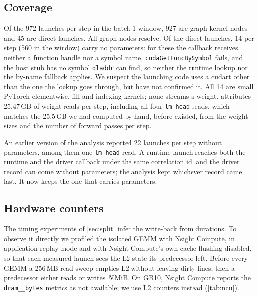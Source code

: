 \subsection{Coverage}\label{sec:coverage}

Of the 972 launches per step in the batch-1 window, 927 are graph kernel nodes and 45 are direct
launches. All graph nodes resolve. Of the direct launches, 14 per step (560 in the window) carry
no parameters: for these the callback receives neither a function handle nor a symbol name,
\texttt{cudaGetFuncBySymbol} fails, and the host stub has no symbol \texttt{dladdr} can find, so
neither the runtime lookup nor the by-name fallback applies. We suspect the launching code uses a
cudart other than the one the lookup goes through, but have not confirmed it. All 14 are small
PyTorch elementwise, fill and indexing kernels; none streams a weight. \sys{} attributes 25.47\,GB
of weight reads per step, including all four \texttt{lm\_head} reads, which matches the 25.5\,GB
we had computed by hand, before \sys{} existed, from the weight sizes and the number of forward
passes per step.

An earlier version of the analysis reported 22 launches per step without parameters, among them
one \texttt{lm\_head} read. A runtime launch reaches both the runtime and the driver callback under
the same correlation id, and the driver record can come without parameters; the analysis kept
whichever record came last. It now keeps the one that carries parameters.

\subsection{Hardware counters}\label{sec:ncu}

The timing experiments of \cref{sec:split} infer the write-back from durations. To observe it
directly we profiled the isolated GEMM with Nsight Compute, in application replay mode and with
Nsight Compute's own cache flushing disabled, so that each measured launch sees the L2 state its
predecessor left. Before every GEMM a 256\,MB read sweep empties L2 without leaving dirty lines;
then a predecessor either reads or writes $N$\,MiB. On GB10, Nsight Compute reports the \texttt{dram\_\_bytes} metrics as not available; we use L2 counters instead (\cref{tab:ncu}).

